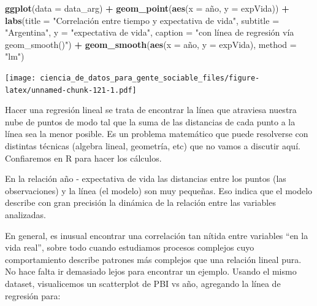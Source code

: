 \documentclass[spanish,]{book}
\newenvironment{Shaded}{\begin{snugshade}}{\end{snugshade}}
\newcommand{\DataTypeTok}[1]{\textcolor[rgb]{0.13,0.29,0.53}{#1}}
\newcommand{\KeywordTok}[1]{\textcolor[rgb]{0.13,0.29,0.53}{\textbf{#1}}}
\newcommand{\NormalTok}[1]{#1}
\newcommand{\OperatorTok}[1]{\textcolor[rgb]{0.81,0.36,0.00}{\textbf{#1}}}
\newcommand{\StringTok}[1]{\textcolor[rgb]{0.31,0.60,0.02}{#1}}
\begin{document}
\begin{Shaded}
\begin{Highlighting}[]
\KeywordTok{ggplot}\NormalTok{(}\DataTypeTok{data =}\NormalTok{ data_arg) }\OperatorTok{+}\StringTok{ }
\StringTok{    }\KeywordTok{geom_point}\NormalTok{(}\KeywordTok{aes}\NormalTok{(}\DataTypeTok{x =}\NormalTok{ año, }\DataTypeTok{y =}\NormalTok{ expVida)) }\OperatorTok{+}
\StringTok{    }\KeywordTok{labs}\NormalTok{(}\DataTypeTok{title =} \StringTok{"Correlación entre tiempo y expectativa de vida"}\NormalTok{,}
         \DataTypeTok{subtitle =} \StringTok{"Argentina"}\NormalTok{,}
         \DataTypeTok{y =} \StringTok{"expectativa de vida"}\NormalTok{,}
         \DataTypeTok{caption =} \StringTok{"con línea de regresión vía geom_smooth()"}\NormalTok{) }\OperatorTok{+}
\StringTok{    }\KeywordTok{geom_smooth}\NormalTok{(}\KeywordTok{aes}\NormalTok{(}\DataTypeTok{x =}\NormalTok{ año, }\DataTypeTok{y =}\NormalTok{ expVida), }\DataTypeTok{method =} \StringTok{"lm"}\NormalTok{)}
\end{Highlighting}
\end{Shaded}

\texttt{[image: ciencia\_de\_datos\_para\_gente\_sociable\_files/figure-latex/unnamed-chunk-121-1.pdf]}

Hacer una regresión lineal se trata de encontrar la línea que atraviesa nuestra nube de puntos de modo tal que la suma de las distancias de cada punto a la línea sea la menor posible. Es un problema matemático que puede resolverse con distintas técnicas (algebra lineal, geometría, etc) que no vamos a discutir aquí. Confiaremos en R para hacer los cálculos.

En la relación año - expectativa de vida las distancias entre los puntos (las observaciones) y la línea (el modelo) son muy pequeñas. Eso indica que el modelo describe con gran precisión la dinámica de la relación entre las variables analizadas.

En general, es inusual encontrar una correlación tan nítida entre variables ``en la vida real'', sobre todo cuando estudiamos procesos complejos cuyo comportamiento describe patrones más complejos que una relación lineal pura. No hace falta ir demasiado lejos para encontrar un ejemplo. Usando el mismo dataset, visualicemos un scatterplot de PBI vs año, agregando la línea de regresión para:
\end{document}
